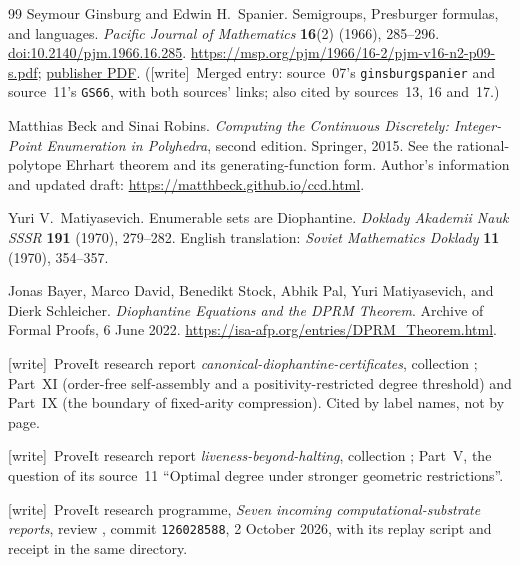 \documentclass[11pt,letterpaper]{article}
\numberwithin{equation}{section}
\theoremstyle{definition}
\theoremstyle{remark}
\newcommand{\wtag}{\textup{[write]}}
\begin{document}
\begin{thebibliography}{99}
Seymour Ginsburg and Edwin H.\ Spanier.
Semigroups, Presburger formulas, and languages.
\emph{Pacific Journal of Mathematics} \textbf{16}(2) (1966), 285--296.
\href{https://doi.org/10.2140/pjm.1966.16.285}{doi:10.2140/pjm.1966.16.285}.
\url{https://msp.org/pjm/1966/16-2/pjm-v16-n2-p09-s.pdf};
\href{https://msp.org/pjm/1966/16-2/pjm-v16-n2-p09-p.pdf}{publisher PDF}.
(\wtag\ Merged entry: source~07's \texttt{ginsburgspanier} and source~11's \texttt{GS66}, with both sources' links; also cited by sources~13, 16 and~17.)

Matthias Beck and Sinai Robins.
\emph{Computing the Continuous Discretely: Integer-Point Enumeration in
Polyhedra}, second edition. Springer, 2015.
See the rational-polytope Ehrhart theorem and its generating-function form.
Author's information and updated draft:
\url{https://matthbeck.github.io/ccd.html}.

Yuri V.\ Matiyasevich.
Enumerable sets are Diophantine.
\emph{Doklady Akademii Nauk SSSR} \textbf{191} (1970), 279--282.
English translation: \emph{Soviet Mathematics Doklady}
\textbf{11} (1970), 354--357.

Jonas Bayer, Marco David, Benedikt Stock, Abhik Pal,
Yuri Matiyasevich, and Dierk Schleicher.
\emph{Diophantine Equations and the DPRM Theorem}.
Archive of Formal Proofs, 6 June 2022.
\url{https://isa-afp.org/entries/DPRM_Theorem.html}.

\wtag\ ProveIt research report \emph{canonical-diophantine-certificates}, collection ; Part~XI (order-free self-assembly and a positivity-restricted degree threshold) and Part~IX (the boundary of fixed-arity compression). Cited by label names, not by page.

\wtag\ ProveIt research report \emph{liveness-beyond-halting}, collection ; Part~V, the question of its source~11 ``Optimal degree under stronger geometric restrictions''.

\wtag\ ProveIt research programme, \emph{Seven incoming computational-substrate reports}, review , commit \texttt{126028588}, 2 October 2026, with its replay script and receipt in the same directory.


\end{thebibliography}
\end{document}
